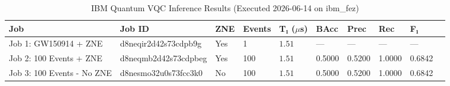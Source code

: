 \begin{table}[h]
\centering
\caption{IBM Quantum VQC Inference Results (Executed 2026-06-14 on ibm\_fez)}
\label{tab:vqc_results}
\begin{tabular}{llllllllll}
\hline
Job & Job ID & ZNE & Events & T₁ ($\mu$s) & BAcc & Prec & Rec & F₁ \\
\hline
Job 1: GW150914 + ZNE & d8neqir2d42s73cdpb9g & Yes & 1 & $1.51$ & — & — & — & — \\
Job 2: 100 Events + ZNE & d8neqmb2d42s73cdpbeg & Yes & 100 & $1.51$ & 0.5000 & 0.5200 & 1.0000 & 0.6842 \\
Job 3: 100 Events - No ZNE & d8nesmo32u0s73fcc3k0 & No & 100 & $1.51$ & 0.5000 & 0.5200 & 1.0000 & 0.6842 \\
\hline
\end{tabular}
\end{table}
